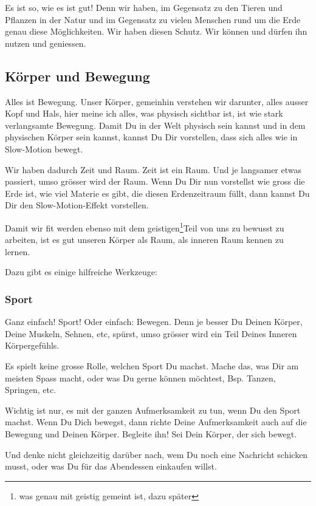 \documentclass[11pt,titlepage,a5paper]{book}
\begin{document}
Es ist so, wie es ist gut! Denn wir haben, im Gegensatz zu den Tieren und Pflanzen in der Natur und im Gegensatz zu vielen Menschen rund um die Erde genau diese Möglichkeiten. Wir haben diesen Schutz. Wir können und dürfen ihn nutzen und geniessen.


\subsection{Körper und Bewegung}

Alles ist Bewegung. Unser Körper, gemeinhin verstehen wir darunter, alles ausser Kopf und Hals, hier meine ich alles, was physisch sichtbar ist, ist wie stark verlangsamte Bewegung. Damit Du in der Welt physisch sein kannst und in dem physischen Körper sein kannst, kannst Du Dir vorstellen, dass sich alles wie in Slow-Motion bewegt.

Wir haben dadurch Zeit und Raum. Zeit ist ein Raum. Und je langsamer etwas passiert, umso grösser wird der Raum. Wenn Du Dir nun vorstellst wie gross die Erde ist, wie viel Materie es gibt, die diesen Erdenzeitraum füllt, dann kannst Du Dir den Slow-Motion-Effekt vorstellen.

Damit wir fit werden ebenso mit dem geistigen\footnote{was genau mit geistig gemeint ist, dazu später}Teil von uns zu bewusst zu arbeiten, ist es gut unseren Körper als Raum, als inneren Raum kennen zu lernen.

Dazu gibt es einige hilfreiche Werkzeuge:

\subsubsection{Sport}

Ganz einfach! Sport! Oder einfach: Bewegen. Denn je besser Du Deinen Körper, Deine Muskeln, Sehnen, etc, spürst, umso grösser wird ein Teil Deines Inneren Körpergefühls.

Es spielt keine grosse Rolle, welchen Sport Du machst. Mache das, was Dir am meisten Spass macht, oder was Du gerne können möchtest, Bsp. Tanzen, Springen, etc.

Wichtig ist nur, es mit der ganzen Aufmerksamkeit zu tun, wenn Du den Sport machst. Wenn Du Dich bewegst, dann richte Deine Aufmerksamkeit auch auf die Bewegung und Deinen Körper. Begleite ihn! Sei Dein Körper, der sich bewegt.

Und denke nicht gleichzeitig darüber nach, wem Du noch eine Nachricht schicken musst, oder was Du für das Abendessen einkaufen willst.
\end{document}
